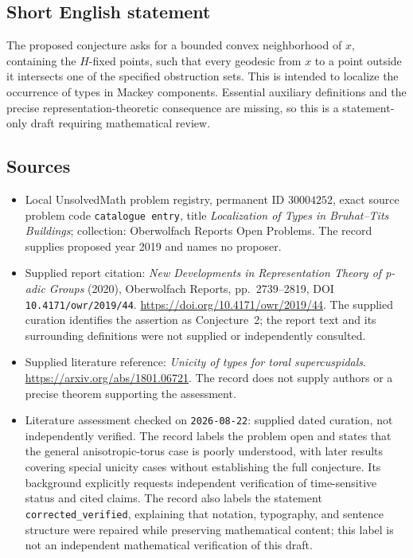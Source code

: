\documentclass[11pt]{article}
\begin{document}
\subsection{Short English statement}
The proposed conjecture asks for a bounded convex neighborhood of \(x\), containing the \(H\)-fixed points, such that every geodesic from \(x\) to a point outside it intersects one of the specified obstruction sets. This is intended to localize the occurrence of types in Mackey components. Essential auxiliary definitions and the precise representation-theoretic consequence are missing, so this is a statement-only draft requiring mathematical review.
\subsection{Sources}
\begin{itemize}
\item Local UnsolvedMath problem registry, permanent ID \(30004252\), exact source problem code \texttt{catalogue entry}, title \emph{Localization of Types in Bruhat--Tits Buildings}; collection: Oberwolfach Reports Open Problems. The record supplies proposed year 2019 and names no proposer.
\item Supplied report citation: \emph{New Developments in Representation Theory of p-adic Groups} (2020), Oberwolfach Reports, pp.~2739--2819, DOI \texttt{10.4171/owr/2019/44}. \url{https://doi.org/10.4171/owr/2019/44}. The supplied curation identifies the assertion as Conjecture~2; the report text and its surrounding definitions were not supplied or independently consulted.
\item Supplied literature reference: \emph{Unicity of types for toral supercuspidals}. \url{https://arxiv.org/abs/1801.06721}. The record does not supply authors or a precise theorem supporting the assessment.
\item Literature assessment checked on \texttt{2026-08-22}: supplied dated curation, not independently verified. The record labels the problem open and states that the general anisotropic-torus case is poorly understood, with later results covering special unicity cases without establishing the full conjecture. Its background explicitly requests independent verification of time-sensitive status and cited claims. The record also labels the statement \texttt{corrected\_verified}, explaining that notation, typography, and sentence structure were repaired while preserving mathematical content; this label is not an independent mathematical verification of this draft.
\end{itemize}
\end{document}
